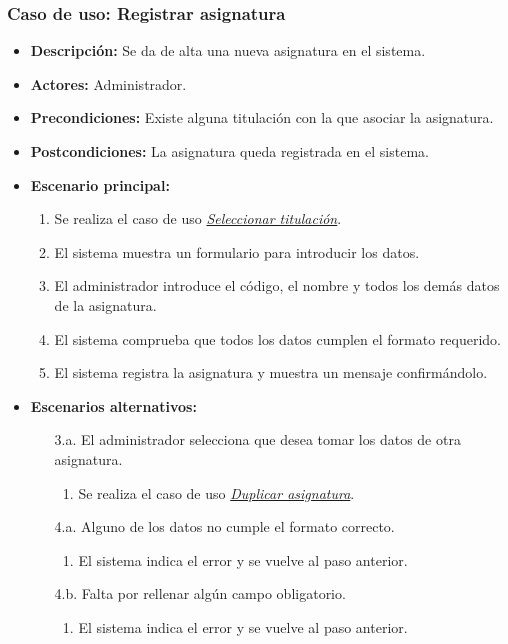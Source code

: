 \documentclass{book}
\begin{document}
\subsubsection*{Caso de uso: Registrar asignatura}
\begin{itemize}
\item{\bf Descripción:} Se da de alta una nueva asignatura en el sistema.
\item{\bf Actores:} Administrador.
\item{\bf Precondiciones:} Existe alguna titulación con la que asociar la asignatura.
\item{\bf Postcondiciones:} La asignatura queda registrada en el sistema.
\item{\bf Escenario principal:}
	\begin{enumerate}
 	\item Se realiza el caso de uso {\em\hyperref[select_titulacion]{Seleccionar titulación}}.
	\item El sistema muestra un formulario para introducir los datos.
	\item El administrador introduce el código, el nombre y todos los demás datos de la asignatura.
	\item El sistema comprueba que todos los datos cumplen el formato requerido.
	\item El sistema registra la asignatura y muestra un mensaje confirmándolo.
	\end{enumerate}
\item{\bf Escenarios alternativos:}
	\begin{itemize}
	\item[3.a.] El administrador selecciona que desea tomar los datos de otra asignatura.
		\begin{enumerate}
		\item Se realiza el caso de uso {\em \hyperref[duplicar_asignatura]{Duplicar asignatura}}.
		\end{enumerate}
	\item[4.a.] Alguno de los datos no cumple el formato correcto.
		\begin{enumerate}
		\item El sistema indica el error y se vuelve al paso anterior.
		\end{enumerate}
	\item[4.b.] Falta por rellenar algún campo obligatorio.
		\begin{enumerate}
		\item El sistema indica el error y se vuelve al paso anterior.
		\end{enumerate}

\end{itemize}
\end{itemize}
\end{document}
